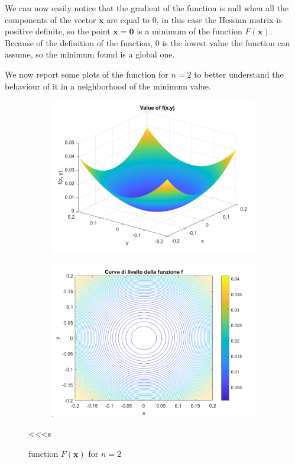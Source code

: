 We can now easily notice that the gradient of the function is null when all the components of the vector $\mathbf{x}$ are equal to 0, in this case the Hessian matrix is positive definite, so the point $\mathbf{x} = \mathbf{0}$ is a minimum of the function $F(\mathbf{x})$. 
Because of the definition of the function, $0$ is the lowest value the function can assume, so the minimum found is a global one.

We now report some plots of the function for $n= 2$ to better understand the behaviour of it in a neighborhood of the minimum value.
\begin{figure}[H]
    \centering
    \begin{subfigure}{0.45\textwidth}
        \centering
        \includegraphics[width=\textwidth]{img/pb76_fig.png}
        \caption{}
    \end{subfigure}
    \hspace{1cm}
    \begin{subfigure}{0.45\textwidth}
        \centering
        \includegraphics[width=\textwidth]{img/pb76_clivello.png}
        \caption{}
    \end{subfigure}
    \caption{function $F(\boldsymbol{x})$ for $n=2$}<<<s
\end{figure}

